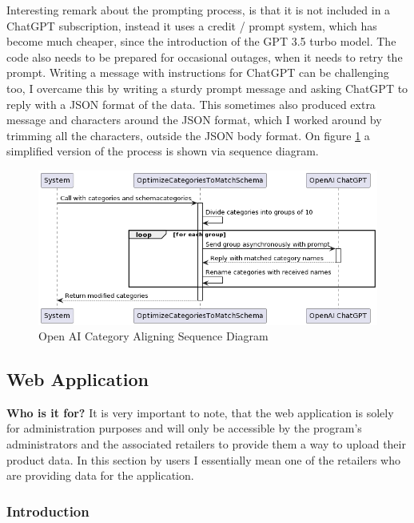 Interesting remark about the prompting process, is that it is not included in a ChatGPT subscription, instead it uses a credit / prompt system, which has become much cheaper, since the introduction of the GPT 3.5 turbo model. The code also needs to be prepared for occasional outages, when it needs to retry the prompt. Writing a message with instructions for ChatGPT can be challenging too, I overcame this by writing a sturdy prompt message and asking ChatGPT to reply with a JSON format of the data. This sometimes also produced extra message and characters around the JSON format, which I worked around by trimming all the characters, outside the JSON body format. On figure \ref{fig:ai} a simplified version of the process is shown via sequence diagram.

\begin{figure}[H]
	\centering
	\includegraphics[width=1\linewidth]{img/openai_sequence.png}
	\caption{Open AI Category Aligning Sequence Diagram}
	\label{fig:ai}
\end{figure}

\pagebreak

\subsection{Web Application}

\noindent\textbf{Who is it for?} It is very important to note, that the web application is solely for administration purposes and will only be accessible by the program's administrators and the associated retailers to provide them a way to upload their product data. In this section by users I essentially mean one of the retailers who are providing data for the application.

\subsubsection{Introduction}

